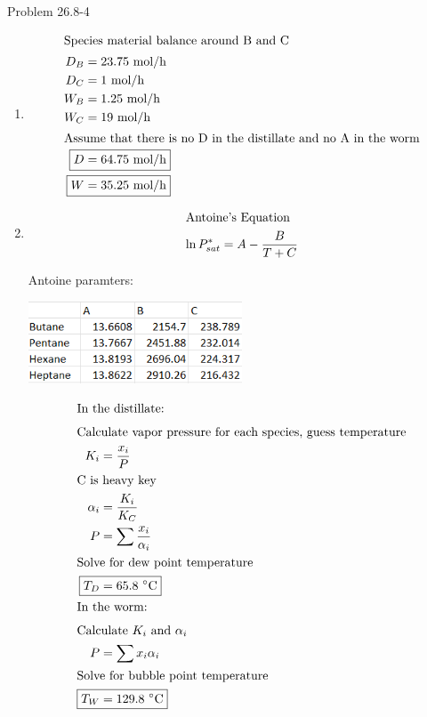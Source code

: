 \item

Problem 26.8-4

\begin{enumerate}
    \item 
    \begin{align*}
        \intertext{Species material balance around B and C}
        D_B &= 23.75 \text{ mol/h} \\
        D_C &= 1 \text{ mol/h} \\  
        W_B &= 1.25 \text{ mol/h} \\   
        W_C &= 19 \text{ mol/h} \\
        \intertext{Assume that there is no D in the distillate and no A in the worm}
        \Aboxed{D &=  64.75 \text{ mol/h}} \\
        \Aboxed{W &=  35.25 \text{ mol/h}}
    \end{align*}

    \item 
    \begin{align*}
        \intertext{Antoine's Equation}
        \ln P_{sat}^* = A - \frac{B}{T + C}    
    \end{align*}

    Antoine paramters:
    \begin{center}
        \includegraphics[width=0.5\textwidth]{assets/antoine.png}
    \end{center}

    \begin{align*}
        \intertext{In the distillate:}
        \intertext{Calculate vapor pressure for each species, guess temperature}
        K_i &= \frac{x_i}{P} \\
        \intertext{C is heavy key}
        \alpha_i &= \frac{K_i}{K_C} \\
        P &= \sum \frac{x_i}{\alpha_i} \\
        \intertext{Solve for dew point temperature}
        \Aboxed{T_{D} &= 65.8 \text{ $^\circ$C}} \\
        \intertext{In the worm:}
        \intertext{Calculate $K_i$ and $\alpha_i$}
        P &= \sum x_i\alpha_i \\
        \intertext{Solve for bubble point temperature}
        \Aboxed{T_{W} &= 129.8 \text{ $^\circ$C}} 
    \end{align*}


\end{enumerate}
